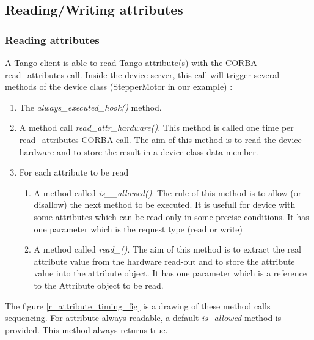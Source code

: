 \subsection{Reading/Writing attributes}

\subsubsection{Reading attributes}

A Tango client is able to read Tango attribute(s)
with the CORBA read\_attributes call. Inside
the device server, this call will trigger several methods of the device
class (StepperMotor in our example) :
\begin{enumerate}
\item The \emph{always\_executed\_hook()}
method. 
\item A method call \emph{read\_attr\_hardware()}.
This method is called one time per read\_attributes CORBA call. The
aim of this method is to read the device hardware and to store the
result in a device class data member.
\item For each attribute to be read

\begin{enumerate}
\item A method called \emph{is\_<att name>\_allowed()}. The rule of this
method is to allow (or disallow) the next method to be executed. It
is usefull for device with some attributes which can be read only
in some precise conditions. It has one parameter which is the request
type (read or write)
\item A method called \emph{read\_<att name>()}. The aim of this method
is to extract the real attribute value from the hardware read-out
and to store the attribute value into the attribute object. It has
one parameter which is a reference to the Attribute object to be read.
\end{enumerate}
\end{enumerate}
The figure \ref{r_attribute_timing_fig} is a drawing of these method
calls sequencing. For attribute always readable, a default \emph{is\_allowed}
method is provided. This method always returns true.
